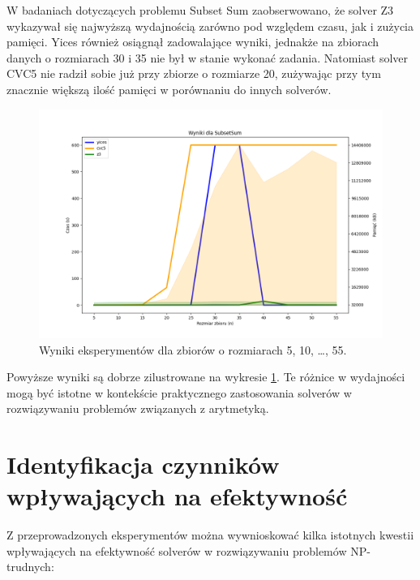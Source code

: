 W badaniach dotyczących problemu Subset Sum zaobserwowano, że solver Z3 wykazywał się najwyższą wydajnością zarówno pod względem czasu, jak i zużycia pamięci. Yices również osiągnął zadowalające wyniki, jednakże na zbiorach danych o rozmiarach 30 i 35 nie był w stanie wykonać zadania. Natomiast solver CVC5 nie radził sobie już przy zbiorze o rozmiarze 20, zużywając przy tym znacznie większą ilość pamięci w porównaniu do innych solverów. 

\begin{figure}[htbp]
	\centering
	\begin{minipage}{\textwidth}
		\includegraphics[width=\textwidth]{./figures/8-plot.png}
		\caption{Wyniki eksperymentów dla zbiorów o rozmiarach 5, 10, \dots, 55.}
		\label{fig:8}
	\end{minipage}
\end{figure}

Powyższe wyniki są dobrze zilustrowane na wykresie \ref{fig:8}. Te różnice w wydajności mogą być istotne w kontekście praktycznego zastosowania solverów w rozwiązywaniu problemów związanych z arytmetyką.

\section{Identyfikacja czynników wpływających na efektywność}

Z przeprowadzonych eksperymentów można wywnioskować kilka istotnych kwestii wpływających na efektywność solverów w rozwiązywaniu problemów NP-trudnych:

